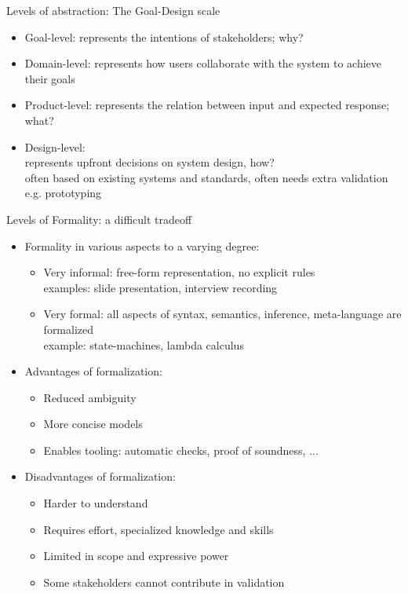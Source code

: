 \documentclass{beamer}
\begin{document}
\begin{frame}[fragile]{Levels of abstraction: The Goal-Design scale}
\begin{itemize}
\item Goal-level: represents the intentions of stakeholders; why? 
\item Domain-level: represents how users collaborate with the system to achieve their goals
\item Product-level: represents the relation between input and expected response; what?
\item Design-level:\\represents upfront decisions on system design, how?\\often based on existing systems and standards, often needs extra validation e.g. prototyping
\end{itemize}
\end{frame}

\begin{frame}[fragile]{Levels of Formality: a difficult tradeoff}

\begin{itemize}
\item Formality in various aspects to a varying degree: 
\begin{itemize}
  \item Very informal: free-form representation, no explicit rules\\examples: slide presentation, interview recording
  \item Very formal: all aspects of syntax, semantics, inference, meta-language are formalized\\example: state-machines, lambda calculus
\end{itemize}
\item Advantages of formalization:
\begin{itemize}
\item Reduced ambiguity
\item More concise models
\item Enables tooling: automatic checks, proof of soundness, ... 
\end{itemize}
\item Disadvantages of formalization:
\begin{itemize}
\item Harder to understand
\item Requires effort, specialized knowledge and skills
\item Limited in scope and expressive power
\item Some stakeholders cannot contribute in validation 
\end{itemize}
\end{itemize}
\end{frame}
\end{document}

